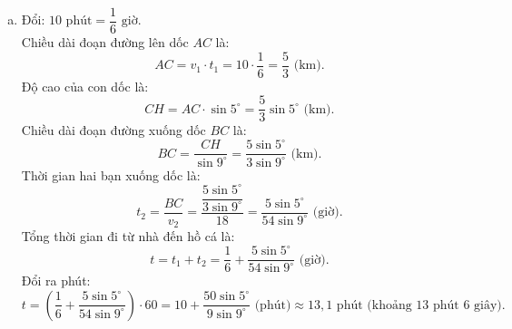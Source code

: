 \begin{bt}
{\begin{enumerate}[a)]
    $$S = AC + BC = \dfrac{x}{\sin 5^\circ} + \dfrac{x}{\sin 9^\circ}\text{ (m)}.$$
    \item Đổi: $10\text{ phút} = \dfrac{1}{6}\text{ giờ}$.\\
    Chiều dài đoạn đường lên dốc $AC$ là:
    $$AC = v_1 \cdot t_1 = 10 \cdot \dfrac{1}{6} = \dfrac{5}{3}\text{ (km)}.$$
    Độ cao của con dốc là:
    $$CH = AC \cdot \sin 5^\circ = \dfrac{5}{3}\sin 5^\circ\text{ (km)}.$$
    Chiều dài đoạn đường xuống dốc $BC$ là:
    $$BC = \dfrac{CH}{\sin 9^\circ} = \dfrac{5\sin 5^\circ}{3\sin 9^\circ}\text{ (km)}.$$
    Thời gian hai bạn xuống dốc là:
    $$t_2 = \dfrac{BC}{v_2} = \dfrac{\dfrac{5\sin 5^\circ}{3\sin 9^\circ}}{18} = \dfrac{5\sin 5^\circ}{54\sin 9^\circ}\text{ (giờ)}.$$
    Tổng thời gian đi từ nhà đến hồ cá là:
    $$t = t_1 + t_2 = \dfrac{1}{6} + \dfrac{5\sin 5^\circ}{54\sin 9^\circ}\text{ (giờ)}.$$
    Đổi ra phút:
    $$t = \left(\dfrac{1}{6} + \dfrac{5\sin 5^\circ}{54\sin 9^\circ}\right) \cdot 60 = 10 + \dfrac{50\sin 5^\circ}{9\sin 9^\circ}\text{ (phút)} \approx 13{,}1\text{ phút (khoảng 13 phút 6 giây)}.$$
\end{enumerate}
}
\end{bt}

